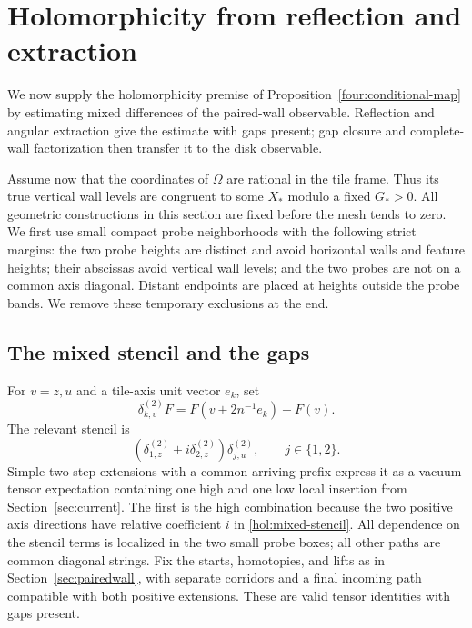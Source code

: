 \section{Holomorphicity from reflection and extraction}
\label{sec:holomorphic}

We now supply the holomorphicity premise of
Proposition~\ref{four:conditional-map} by estimating mixed differences
of the paired-wall observable.  Reflection and angular extraction give
the estimate with gaps present; gap closure and complete-wall
factorization then transfer it to the disk observable.

Assume now that the coordinates of $\Omega$ are rational in the tile
frame.  Thus its true vertical wall levels are congruent to some $X_*$
modulo a fixed $G_*>0$.  All geometric constructions in this section
are fixed before the mesh tends to zero.  We first use small compact
probe neighborhoods with the following strict margins: the two probe
heights are distinct and avoid horizontal walls and feature heights;
their abscissas avoid vertical wall levels; and the two probes are not
on a common axis diagonal.  Distant endpoints are placed at heights
outside the probe bands.  We remove these temporary exclusions at
the end.

\subsection{The mixed stencil and the gaps}

For $v=z,u$ and a tile-axis unit vector $e_k$, set
\begin{equation}
 \delta_{k,v}^{(2)}F=F(v+2n^{-1}e_k)-F(v).
 \label{hol:two-step}
\end{equation}
The relevant stencil is
\begin{equation}
 (\delta_{1,z}^{(2)}+i\delta_{2,z}^{(2)})\delta_{j,u}^{(2)},
 \qquad j\in\{1,2\}.
 \label{hol:mixed-stencil}
\end{equation}
Simple two-step extensions with a common arriving prefix express it
as a vacuum tensor expectation containing one high and one low local
insertion from Section~\ref{sec:current}.  The first is the high
combination because the two positive axis directions have relative
coefficient $i$ in \eqref{hol:mixed-stencil}.  All dependence on the
stencil terms is localized in the two small probe boxes; all other
paths are common diagonal strings.  Fix the starts, homotopies, and
lifts as in Section~\ref{sec:pairedwall}, with separate corridors and
a final incoming path compatible with both positive extensions.
These are valid tensor identities with gaps present.

